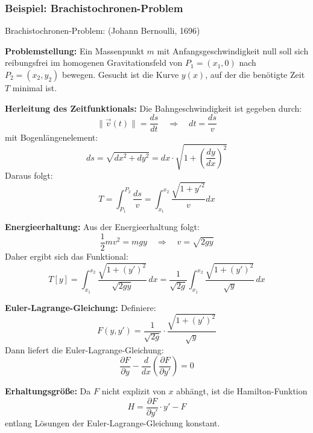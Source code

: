 \documentclass[10pt, letterpaper]{article}
\begin{document}
\subsubsection{Beispiel: Brachistochronen-Problem} 

Brachistochronen-Problem: (Johann Bernoulli, 1696)

\begin{center}
\end{center}

\textbf{Problemstellung:} Ein Massenpunkt $m$ mit Anfangsgeschwindigkeit null soll sich reibungsfrei im homogenen Gravitationsfeld von $P_1 = (x_1, 0)$ nach $P_2 = (x_2, y_2)$ bewegen. Gesucht ist die Kurve $y(x)$, auf der die benötigte Zeit $T$ minimal ist.

\textbf{Herleitung des Zeitfunktionals:} Die Bahngeschwindigkeit ist gegeben durch:
\[
\|\vec{v}(t)\| = \frac{ds}{dt} \quad \Rightarrow \quad dt = \frac{ds}{v}
\]
mit Bogenlängenelement:
\[
ds = \sqrt{dx^2 + dy^2} = dx \cdot \sqrt{1 + \left( \frac{dy}{dx} \right)^2}
\]
Daraus folgt:
\[
T = \int_{P_1}^{P_2} \frac{ds}{v} = \int_{x_1}^{x_2} \frac{\sqrt{1 + y'^2}}{v} dx
\]

\textbf{Energieerhaltung:} Aus der Energieerhaltung folgt:
\[
\frac{1}{2}mv^2 = mgy \quad \Rightarrow \quad v = \sqrt{2gy}
\]
Daher ergibt sich das Funktional:
\[
T[y] = \int_{x_1}^{x_2} \frac{\sqrt{1 + (y')^2}}{\sqrt{2gy}}\, dx
= \frac{1}{\sqrt{2g}} \int_{x_1}^{x_2} \frac{\sqrt{1 + (y')^2}}{\sqrt{y}}\, dx
\]

\textbf{Euler-Lagrange-Gleichung:} Definiere:
\[
F(y, y') = \frac{1}{\sqrt{2g}} \cdot \frac{\sqrt{1 + (y')^2}}{\sqrt{y}}
\]
Dann liefert die Euler-Lagrange-Gleichung:
\[
\frac{\partial F}{\partial y} - \frac{d}{dx} \left( \frac{\partial F}{\partial y'} \right) = 0
\]

\textbf{Erhaltungsgröße:} Da $F$ nicht explizit von $x$ abhängt, ist die Hamilton-Funktion
\[
H = \frac{\partial F}{\partial y'} \cdot y' - F
\]
entlang Lösungen der Euler-Lagrange-Gleichung konstant.
\end{document}
